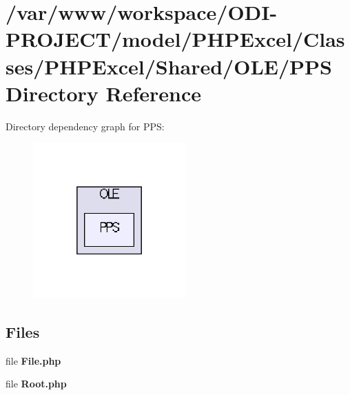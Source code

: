 \section{/var/www/workspace/\+O\+D\+I-\/\+P\+R\+O\+J\+E\+C\+T/model/\+P\+H\+P\+Excel/\+Classes/\+P\+H\+P\+Excel/\+Shared/\+O\+L\+E/\+P\+P\+S Directory Reference}
\label{dir_1c5d9ad43bfec5f172fe8011c8eeab62}
Directory dependency graph for P\+P\+S\+:\nopagebreak
\begin{figure}[H]
\begin{center}
\leavevmode
\includegraphics[width=166pt]{dir_1c5d9ad43bfec5f172fe8011c8eeab62_dep}
\end{center}
\end{figure}
\subsection*{Files}
\begin{DoxyCompactItemize}
\item 
file {\bfseries File.\+php}
\item 
file {\bfseries Root.\+php}
\end{DoxyCompactItemize}
